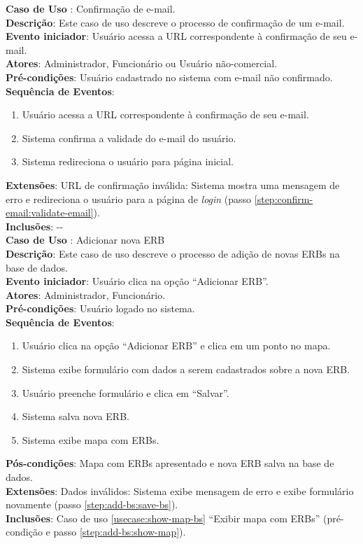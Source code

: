 \documentclass[]{politex}
\begin{document}
\noindent \textbf{Caso de Uso }: Confirmação de e-mail. \\
\textbf{Descrição}: Este caso de uso descreve o processo de confirmação de um e-mail. \\
\textbf{Evento iniciador}: Usuário acessa a URL correspondente à confirmação de seu e-mail. \\
\textbf{Atores}: Administrador, Funcionário ou Usuário não-comercial. \\
\textbf{Pré-condições}: Usuário cadastrado no sistema com e-mail não confirmado. \\
\textbf{Sequência de Eventos}:
\begin{enumerate}
\item Usuário acessa a URL correspondente à confirmação de seu e-mail.
\item\label{step:confirm-email:validate-email} Sistema confirma a validade do e-mail do usuário.
\item Sistema redireciona o usuário para página inicial.
\end{enumerate}
\textbf{Extensões}: URL de confirmação inválida: Sistema mostra uma mensagem de
erro e redireciona o usuário para a página de \textit{login} (passo \ref{step:confirm-email:validate-email}). \\
\textbf{Inclusões}: -{}- \\

\noindent \textbf{Caso de Uso }: Adicionar nova ERB \\
\textbf{Descrição}: Este caso de uso descreve o processo de adição de novas
ERBs na base de dados. \\
\textbf{Evento iniciador}: Usuário clica na opção ``Adicionar ERB''. \\
\textbf{Atores}: Administrador, Funcionário. \\
\textbf{Pré-condições}: Usuário logado no sistema. \\
\textbf{Sequência de Eventos}:
\begin{enumerate}
\item Usuário clica na opção ``Adicionar ERB'' e clica em um ponto no mapa.
\item Sistema exibe formulário com dados a serem cadastrados sobre a nova ERB.
\item Usuário preenche formulário e clica em ``Salvar''.
\item\label{step:add-bs:save-bs} Sistema salva nova ERB.
\item\label{step:add-bs:show-map} Sistema exibe mapa com ERBs.
\end{enumerate}
\textbf{Pós-condições}: Mapa com ERBs apresentado e nova ERB salva na base de
dados. \\
\textbf{Extensões}: Dados inválidos: Sistema exibe mensagem de erro e exibe
formulário novamente (passo \ref{step:add-bs:save-bs}). \\
\textbf{Inclusões}: Caso de uso \ref{usecase:show-map-bs} ``Exibir mapa com ERBs'' (pré-condição e passo \ref{step:add-bs:show-map}).\\
\end{document}
